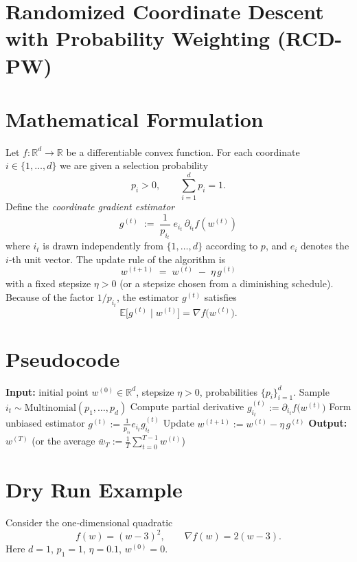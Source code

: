\documentclass{article}
\newcommand{\E}{\mathbb{E}}
\newcommand{\R}{\mathbb{R}}
\begin{document}
\section*{Randomized Coordinate Descent with Probability Weighting (RCD-PW)}

\section*{Mathematical Formulation}
Let $f:\R^{d}\rightarrow\R$ be a differentiable convex function.  
For each coordinate $i\in\{1,\dots,d\}$ we are given a selection probability
\[
p_i>0,\qquad \sum_{i=1}^{d}p_i=1 .
\]
Define the \emph{coordinate gradient estimator}
\[
\boxed{\; g^{(t)} \;:=\; \frac{1}{p_{i_t}}\; e_{i_t}\,\partial_{i_t} f(w^{(t)})\;}
\tag{1}
\]
where $i_t$ is drawn independently from $\{1,\dots,d\}$ according to $p$, and
$e_i$ denotes the $i$‑th unit vector.  
The update rule of the algorithm is
\[
\boxed{\; w^{(t+1)} \;=\; w^{(t)} \;-\; \eta\, g^{(t)}\;}
\tag{2}
\]
with a fixed stepsize $\eta>0$ (or a stepsize chosen from a diminishing schedule).  
Because of the factor $1/p_{i_t}$, the estimator $g^{(t)}$ satisfies
\[
\E\bigl[g^{(t)}\mid w^{(t)}\bigr]=\nabla f\!\bigl(w^{(t)}\bigr).
\tag{3}
\]

\section*{Pseudocode}
\begin{algorithm}[H]
\caption{Randomized Coordinate Descent with Probability Weighting}
\begin{algorithmic}[1]
\STATE \textbf{Input:} initial point $w^{(0)}\in\R^{d}$, stepsize $\eta>0$, probabilities $\{p_i\}_{i=1}^{d}$.
    \STATE Sample $i_t\sim\text{Multinomial}(p_1,\dots,p_d)$
    \STATE Compute partial derivative $g_{i_t}^{(t)}:=\partial_{i_t}f\!\bigl(w^{(t)}\bigr)$
    \STATE Form unbiased estimator $g^{(t)}:=\frac{1}{p_{i_t}}e_{i_t} g^{(t)}_{i_t}$
    \STATE Update $w^{(t+1)}:= w^{(t)} - \eta\, g^{(t)}$
\ENDFOR
\STATE \textbf{Output:} $w^{(T)}$ (or the average $\bar w_T:=\frac1T\sum_{t=0}^{T-1}w^{(t)}$)
\end{algorithmic}
\end{algorithm}

\section*{Dry Run Example}
Consider the one‑dimensional quadratic
\[
f(w)=(w-3)^2,
\qquad \nabla f(w)=2(w-3).
\]
Here $d=1$, $p_1=1$, $\eta=0.1$, $w^{(0)}=0$.
\end{document}
